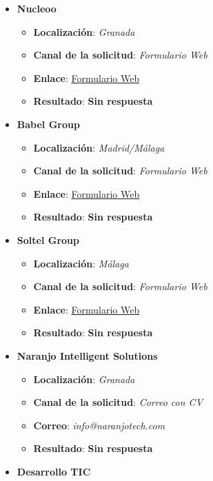 \begin{itemize}
	\item \textbf{Nucleoo}
	\begin{itemize}
		\item \textbf{Localización}: \textit{Granada}
		\item \textbf{Canal de la solicitud}: \textit{Formulario Web}
		\item \textbf{Enlace}: \href{https://nucleoo.factorialhr.es/apply}{Formulario Web}
		\item \textbf{Resultado}: {\color{orange} \textbf{Sin respuesta}}
	\end{itemize}
	 \item \textbf{Babel Group}
	\begin{itemize}
		\item \textbf{Localización}: \textit{Madrid/Málaga}
		\item \textbf{Canal de la solicitud}: \textit{Formulario Web}
		\item \textbf{Enlace}: \href{https://babelgroup.wd103.myworkdayjobs.com/es/REC_External_Career_Site/job/Prcticas-FPGS---Software-Engineer--Infrastructure-Technician_JR102635}{Formulario Web}
		\item \textbf{Resultado}: {\color{orange} \textbf{Sin respuesta}}
	\end{itemize}
	 \item \textbf{Soltel Group}
	\begin{itemize}
		\item \textbf{Localización}: \textit{Málaga}
		\item \textbf{Canal de la solicitud}: \textit{Formulario Web}
		\item \textbf{Enlace}: \href{https://www.soltel.es/unete-a-nosotros/}{Formulario Web}
		\item \textbf{Resultado}: {\color{orange} \textbf{Sin respuesta}}
	\end{itemize}
    \item \textbf{Naranjo Intelligent Solutions}
	\begin{itemize}
		\item \textbf{Localización}: \textit{Granada}
		\item \textbf{Canal de la solicitud}: \textit{Correo con CV}
		\item \textbf{Correo}: \textit{info@naranjotech.com}
		\item \textbf{Resultado}: {\color{orange} \textbf{Sin respuesta}}
	\end{itemize}
	\item \textbf{Desarrollo TIC}
	\begin{itemize}

\end{itemize}
\end{itemize}
